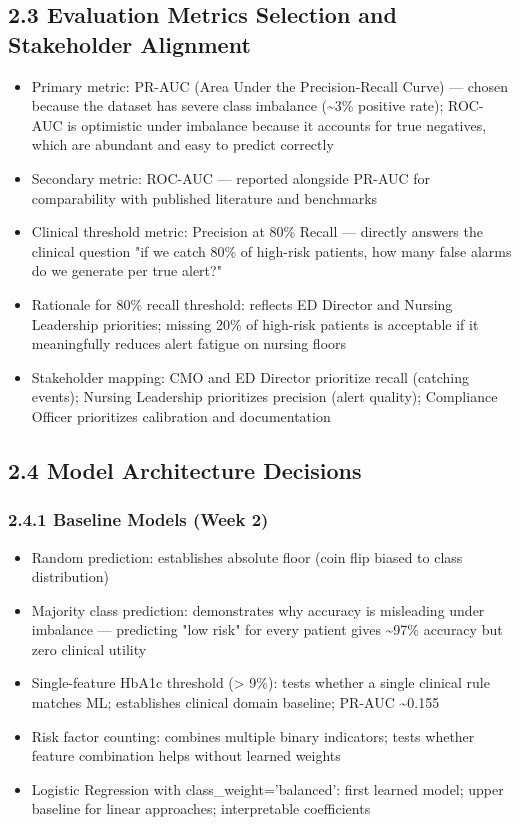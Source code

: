 \documentclass[11pt,a4paper]{article}
\begin{document}
\subsection{2.3 Evaluation Metrics Selection and Stakeholder Alignment}
\begin{itemize}
\item Primary metric: PR-AUC (Area Under the Precision-Recall Curve) --- chosen because the dataset has severe class imbalance (\textasciitilde{}3\% positive rate); ROC-AUC is optimistic under imbalance because it accounts for true negatives, which are abundant and easy to predict correctly
\item Secondary metric: ROC-AUC --- reported alongside PR-AUC for comparability with published literature and benchmarks
\item Clinical threshold metric: Precision at 80\% Recall --- directly answers the clinical question "if we catch 80\% of high-risk patients, how many false alarms do we generate per true alert?"
\item Rationale for 80\% recall threshold: reflects ED Director and Nursing Leadership priorities; missing 20\% of high-risk patients is acceptable if it meaningfully reduces alert fatigue on nursing floors
\item Stakeholder mapping: CMO and ED Director prioritize recall (catching events); Nursing Leadership prioritizes precision (alert quality); Compliance Officer prioritizes calibration and documentation
\end{itemize}

\subsection{2.4 Model Architecture Decisions}

\subsubsection{2.4.1 Baseline Models (Week 2)}
\begin{itemize}
\item Random prediction: establishes absolute floor (coin flip biased to class distribution)
\item Majority class prediction: demonstrates why accuracy is misleading under imbalance --- predicting "low risk" for every patient gives \textasciitilde{}97\% accuracy but zero clinical utility
\item Single-feature HbA1c threshold (> 9\%): tests whether a single clinical rule matches ML; establishes clinical domain baseline; PR-AUC \textasciitilde{}0.155
\item Risk factor counting: combines multiple binary indicators; tests whether feature combination helps without learned weights
\item Logistic Regression with class\_weight='balanced': first learned model; upper baseline for linear approaches; interpretable coefficients
\end{itemize}
\end{document}
